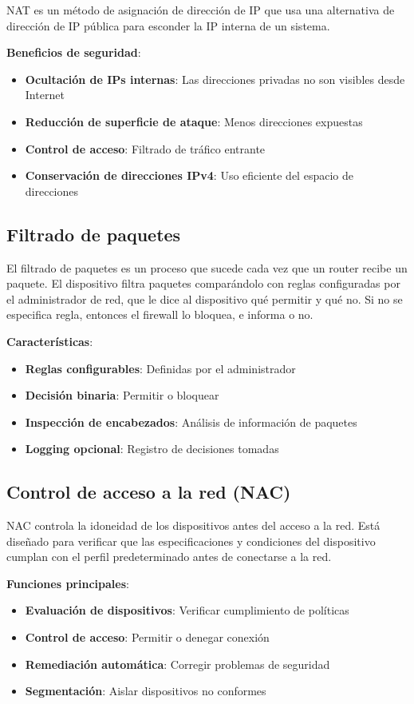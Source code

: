 NAT es un método de asignación de dirección de IP que usa una alternativa de dirección de IP pública para esconder la IP interna de un sistema.

\textbf{Beneficios de seguridad}:
\begin{itemize}
    \item \textbf{Ocultación de IPs internas}: Las direcciones privadas no son visibles desde Internet
    \item \textbf{Reducción de superficie de ataque}: Menos direcciones expuestas
    \item \textbf{Control de acceso}: Filtrado de tráfico entrante
    \item \textbf{Conservación de direcciones IPv4}: Uso eficiente del espacio de direcciones
\end{itemize}

\subsection{Filtrado de paquetes}

El filtrado de paquetes es un proceso que sucede cada vez que un router recibe un paquete. El dispositivo filtra paquetes comparándolo con reglas configuradas por el administrador de red, que le dice al dispositivo qué permitir y qué no. Si no se especifica regla, entonces el firewall lo bloquea, e informa o no.

\textbf{Características}:
\begin{itemize}
    \item \textbf{Reglas configurables}: Definidas por el administrador
    \item \textbf{Decisión binaria}: Permitir o bloquear
    \item \textbf{Inspección de encabezados}: Análisis de información de paquetes
    \item \textbf{Logging opcional}: Registro de decisiones tomadas
\end{itemize}

\subsection{Control de acceso a la red (NAC)}

NAC controla la idoneidad de los dispositivos antes del acceso a la red. Está diseñado para verificar que las especificaciones y condiciones del dispositivo cumplan con el perfil predeterminado antes de conectarse a la red.

\textbf{Funciones principales}:
\begin{itemize}
    \item \textbf{Evaluación de dispositivos}: Verificar cumplimiento de políticas
    \item \textbf{Control de acceso}: Permitir o denegar conexión
    \item \textbf{Remediación automática}: Corregir problemas de seguridad
    \item \textbf{Segmentación}: Aislar dispositivos no conformes
\end{itemize}


